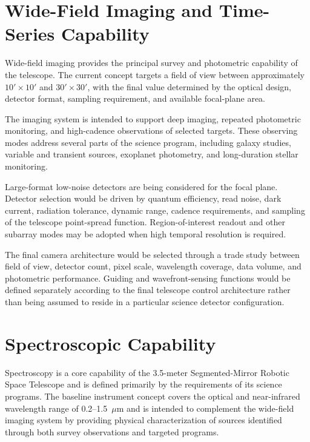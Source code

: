 \section{Wide-Field Imaging and Time-Series Capability}

Wide-field imaging provides the principal survey and photometric capability
of the telescope. The current concept targets a field of view between
approximately $10' \times 10'$ and $30' \times 30'$, with the final value
determined by the optical design, detector format, sampling requirement,
and available focal-plane area.

The imaging system is intended to support deep imaging, repeated
photometric monitoring, and high-cadence observations of selected targets.
These observing modes address several parts of the science program,
including galaxy studies, variable and transient sources, exoplanet
photometry, and long-duration stellar monitoring.

Large-format low-noise detectors are being considered for the focal plane.
Detector selection would be driven by quantum efficiency, read noise, dark
current, radiation tolerance, dynamic range, cadence requirements, and
sampling of the telescope point-spread function. Region-of-interest
readout and other subarray modes may be adopted when high temporal
resolution is required.

The final camera architecture would be selected through a trade study
between field of view, detector count, pixel scale, wavelength coverage,
data volume, and photometric performance. Guiding and wavefront-sensing
functions would be defined separately according to the final telescope
control architecture rather than being assumed to reside in a particular
science detector configuration.


\section{Spectroscopic Capability}

Spectroscopy is a core capability of the 3.5-meter Segmented-Mirror Robotic
Space Telescope and is defined primarily by the requirements of its science
programs. The baseline instrument concept covers the optical and
near-infrared wavelength range of 0.2--1.5~$\mu$m and is intended to
complement the wide-field imaging system by providing physical
characterization of sources identified through both survey observations
and targeted programs.

